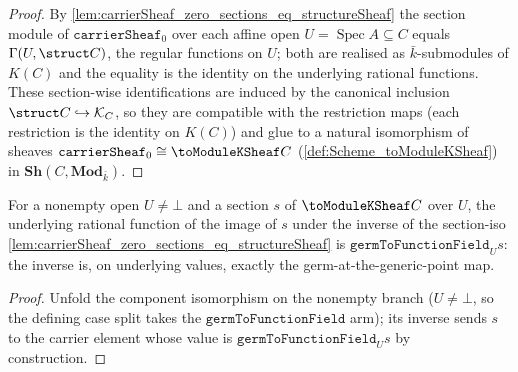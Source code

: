 \begin{proof}
        \leanok
  By \cref{lem:carrierSheaf_zero_sections_eq_structureSheaf} the section module
  of \(\texttt{carrierSheaf}_0\) over each affine open
  \(U = \operatorname{Spec} A \subseteq C\) equals \(\Gamma(U, \struct C)\), the
  regular functions on \(U\); both are realised as \(\bar k\)-submodules of
  \(K(C)\) and the equality is the identity on the underlying rational
  functions. These section-wise identifications are induced by the canonical
  inclusion \(\struct C \hookrightarrow \mathcal K_C\), so they are compatible
  with the restriction maps (each restriction is the identity on \(K(C)\)) and
  glue to a natural isomorphism of sheaves
  \(\texttt{carrierSheaf}_0 \cong \toModuleKSheaf C\)
  (\cref{def:Scheme_toModuleKSheaf}) in
  \(\mathbf{Sh}(C, \mathbf{Mod}_{\bar k})\).
\end{proof}

\begin{lemma}

  \label{lem:carrierSheaf_zero_sections_eq_structureSheaf_inv_coe}
  For a nonempty open \(U \neq \bot\) and a section \(s\) of \(\toModuleKSheaf C\)
  over \(U\), the underlying rational function of the image of \(s\) under the
  inverse of the section-iso \cref{lem:carrierSheaf_zero_sections_eq_structureSheaf}
  is \(\texttt{germToFunctionField}_U s\): the inverse is, on underlying values, exactly
  the germ-at-the-generic-point map.
\end{lemma}
\begin{proof}
  \leanok
  Unfold the component isomorphism on the nonempty branch (\(U \neq \bot\), so the
  defining case split takes the \(\texttt{germToFunctionField}\) arm); its inverse sends
  \(s\) to the carrier element whose value is \(\texttt{germToFunctionField}_U s\) by
  construction.
\end{proof}

